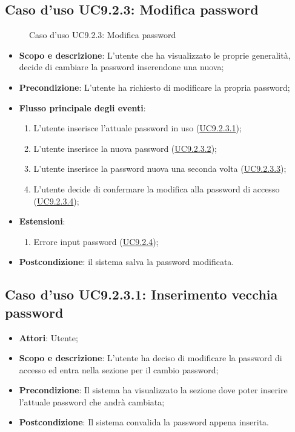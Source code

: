 \documentclass[12pt,a4paper]{article}
\begin{document}
\subsection{Caso d'uso UC9.2.3: Modifica password}
\begin{figure}[H]
	\centering

	\caption{Caso d'uso UC9.2.3: Modifica password}\label{fig:UC9.2.3} 
\end{figure}\begin{itemize}
\item \textbf{Scopo e descrizione}: L’utente che ha visualizzato le proprie generalità, decide di cambiare la password
inserendone una nuova; 
\item \textbf{Precondizione}: L’utente ha richiesto di modificare la propria password;

\item \textbf{Flusso principale degli eventi}:
\begin{enumerate}
	\item L’utente inserisce l’attuale password in uso (\hyperlink{UC9.2.3.1}{UC9.2.3.1});
	\item L’utente inserisce la nuova password (\hyperlink{UC9.2.3.2}{UC9.2.3.2});
	\item L’utente inserisce la password nuova una seconda volta (\hyperlink{UC9.2.3.3}{UC9.2.3.3});
	\item L’utente decide di confermare la modifica alla password di accesso (\hyperlink{UC9.2.3.4}{UC9.2.3.4});
	
\end{enumerate}
\item \textbf{Estensioni}:
\begin{enumerate}
	\item Errore input password (\hyperlink{UC9.2.4}{UC9.2.4});
	
\end{enumerate}
\item \textbf{Postcondizione}: il sistema salva  la password modificata.
\end{itemize}
\hypertarget{UC9.2.3.1}{}
\subsection{Caso d'uso UC9.2.3.1:  Inserimento vecchia password}\begin{itemize}
	\item \textbf{Attori}: Utente;
	\item \textbf{Scopo e descrizione}: L’utente ha deciso di modificare la password di accesso ed entra nella sezione per il cambio password; 
	\item \textbf{Precondizione}: Il sistema ha visualizzato la sezione dove poter inserire l’attuale password che andrà cambiata;
	\item \textbf{Postcondizione}: Il sistema convalida la password appena inserita.
\end{itemize}
\hypertarget{UC9.2.3.2}{}
\end{document}
